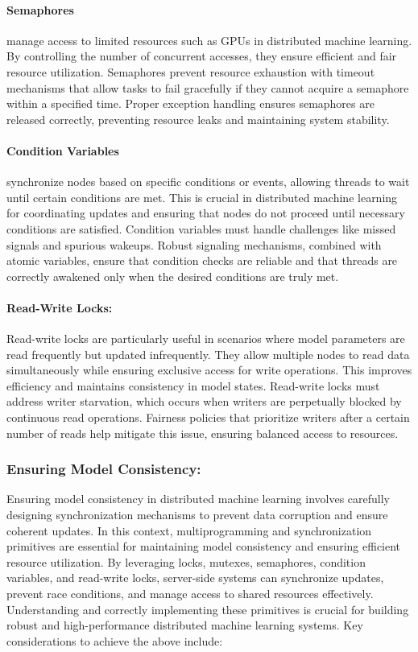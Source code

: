 \paragraph{Semaphores}
manage access to limited resources such as GPUs in distributed machine learning. By controlling the number of concurrent accesses, 
they ensure efficient and fair resource utilization. Semaphores prevent resource exhaustion with timeout 
mechanisms that allow tasks to fail gracefully if they cannot acquire a semaphore within a specified time. Proper exception handling ensures 
semaphores are released correctly, preventing resource leaks and maintaining system stability.

\paragraph{Condition Variables}
synchronize nodes based on specific conditions or events, allowing threads to wait until certain conditions are met. This 
is crucial in distributed machine learning for coordinating updates and ensuring that nodes do not proceed until necessary conditions are satisfied. 
Condition variables must handle challenges like missed signals and spurious wakeups. Robust signaling mechanisms, combined with atomic variables, 
ensure that condition checks are reliable and that threads are correctly awakened only when the desired conditions are truly met.\

\paragraph{Read-Write Locks:}
Read-write locks are particularly useful in scenarios where model parameters are read frequently but updated infrequently. They allow multiple nodes 
to read data simultaneously while ensuring exclusive access for write operations. This improves efficiency and maintains consistency in model states. 
Read-write locks must address writer starvation, which occurs when writers are perpetually blocked by continuous read operations. Fairness policies 
that prioritize writers after a certain number of reads help mitigate this issue, ensuring balanced access to resources.

\subsubsection{Ensuring Model Consistency:}
Ensuring model consistency in distributed machine learning involves carefully designing synchronization mechanisms to prevent data corruption and
ensure coherent updates. In this context, multiprogramming and synchronization primitives are essential for maintaining model consistency and ensuring
efficient resource utilization. By leveraging locks, mutexes, semaphores, condition variables, and read-write locks, server-side systems can synchronize updates,
prevent race conditions, and manage access to shared resources effectively. Understanding and correctly implementing these primitives is crucial for building
robust and high-performance distributed machine learning systems. Key considerations to achieve the above include:

